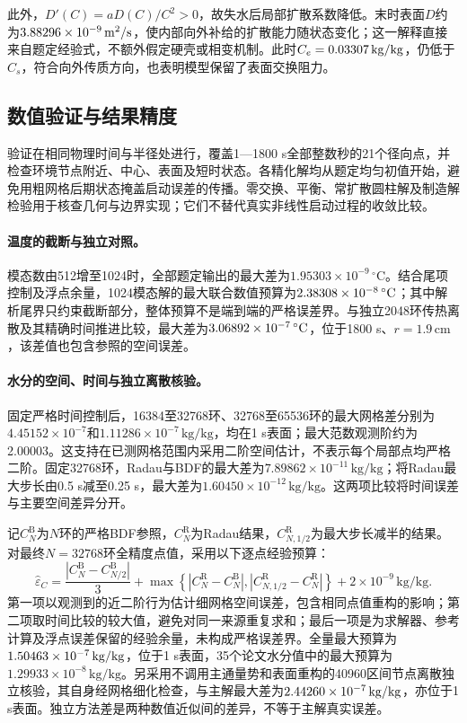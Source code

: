 此外，$D'(C)=aD(C)/C^2>0$，故失水后局部扩散系数降低。末时表面$D$约为$3.88296\times10^{-9}\,\mathrm{m^2/s}$，使内部向外补给的扩散能力随状态变化；这一解释直接来自题定经验式，不额外假定硬壳或相变机制。此时$C_e=0.03307\,\mathrm{kg/kg}$，仍低于$C_s$，符合向外传质方向，也表明模型保留了表面交换阻力。

\subsection{数值验证与结果精度}

验证在相同物理时间与半径处进行，覆盖1—1800 s全部整数秒的21个径向点，并检查环境节点附近、中心、表面及短时状态。各精化解均从题定均匀初值开始，避免用粗网格后期状态掩盖启动误差的传播。零交换、平衡、常扩散圆柱解及制造解检验用于核查几何与边界实现；它们不替代真实非线性启动过程的收敛比较。

\paragraph{温度的截断与独立对照。}
模态数由512增至1024时，全部题定输出的最大差为$1.95303\times10^{-9}\,{}^{\circ}\mathrm C$。结合尾项控制及浮点余量，1024模态解的最大联合数值预算为$2.38308\times10^{-8}\,{}^{\circ}\mathrm C$；其中解析尾界只约束截断部分，整体预算不是端到端的严格误差界。与独立2048环传热离散及其精确时间推进比较，最大差为$3.06892\times10^{-7}\,{}^{\circ}\mathrm C$，位于1800 s、$r=1.9\,\mathrm{cm}$，该差值也包含参照的空间误差。

\paragraph{水分的空间、时间与独立离散核验。}
固定严格时间控制后，16384至32768环、32768至65536环的最大网格差分别为$4.45152\times10^{-7}$和$1.11286\times10^{-7}\,\mathrm{kg/kg}$，均在1 s表面；最大范数观测阶约为2.00003。这支持在已测网格范围内采用二阶空间估计，不表示每个局部点均严格二阶。固定32768环，Radau与BDF的最大差为$7.89862\times10^{-11}\,\mathrm{kg/kg}$；将Radau最大步长由0.5 s减至0.25 s，最大差为$1.60450\times10^{-12}\,\mathrm{kg/kg}$。这两项比较将时间误差与主要空间差异分开。

记$C_N^{\mathrm B}$为$N$环的严格BDF参照，$C_N^{\mathrm R}$为Radau结果，$C_{N,1/2}^{\mathrm R}$为最大步长减半的结果。对最终$N=32768$环全精度点值，采用以下逐点经验预算：
\begin{equation}
\widehat\varepsilon_C=
\frac{|C_N^{\mathrm B}-C_{N/2}^{\mathrm B}|}{3}
+\max\!\left\{|C_N^{\mathrm R}-C_N^{\mathrm B}|,
               |C_{N,1/2}^{\mathrm R}-C_N^{\mathrm R}|\right\}
+2\times10^{-9}\,\mathrm{kg/kg}.
\label{eq:q1-budget}
\end{equation}
第一项以观测到的近二阶行为估计细网格空间误差，包含相同点值重构的影响；第二项取时间比较的较大值，避免对同一来源重复求和；最后一项是为求解器、参考计算及浮点误差保留的经验余量，未构成严格误差界。全量最大预算为$1.50463\times10^{-7}\,\mathrm{kg/kg}$，位于1 s表面，35个论文水分值中的最大预算为$1.29933\times10^{-8}\,\mathrm{kg/kg}$。另采用不调用主通量势和表面重构的40960区间节点离散独立核验，其自身经网格细化检查，与主解最大差为$2.44260\times10^{-7}\,\mathrm{kg/kg}$，亦位于1 s表面。独立方法差是两种数值近似间的差异，不等于主解真实误差。

